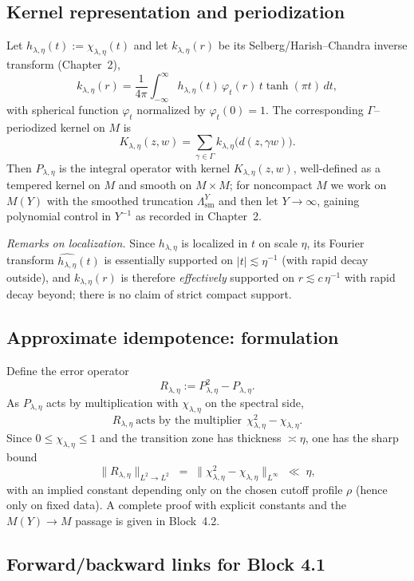 \subsection*{Kernel representation and periodization}

Let $h_{\lambda,\eta}(t):=\chi_{\lambda,\eta}(t)$ and let $k_{\lambda,\eta}(r)$ be its
Selberg/Harish–Chandra inverse transform (Chapter~2),
\[
  k_{\lambda,\eta}(r)
  = \frac{1}{4\pi}\int_{-\infty}^{\infty} h_{\lambda,\eta}(t)\,\varphi_t(r)\,t\tanh(\pi t)\,dt,
\]
with spherical function $\varphi_t$ normalized by $\varphi_t(0)=1$.
The corresponding $\Gamma$–periodized kernel on $M$ is
\[
  K_{\lambda,\eta}(z,w)=\sum_{\gamma\in\Gamma} k_{\lambda,\eta}\!\big(d(z,\gamma w)\big).
\]
Then $P_{\lambda,\eta}$ is the integral operator with kernel $K_{\lambda,\eta}(z,w)$,
well-defined as a tempered kernel on $M$ and smooth on $M\times M$; for noncompact $M$
we work on $M(Y)$ with the smoothed truncation $\Lambda^Y_{\mathrm{sm}}$ and then let $Y\to\infty$,
gaining polynomial control in $Y^{-1}$ as recorded in Chapter~2. 

\medskip
\noindent\emph{Remarks on localization.}
Since $h_{\lambda,\eta}$ is localized in $t$ on scale $\eta$, its Fourier transform
$\widehat{h_{\lambda,\eta}}(t)$ is essentially supported on $|t|\lesssim \eta^{-1}$
(with rapid decay outside), and $k_{\lambda,\eta}(r)$ is therefore \emph{effectively} supported on
$r\lesssim c\,\eta^{-1}$ with rapid decay beyond; there is no claim of strict compact support.

\subsection*{Approximate idempotence: formulation}

Define the error operator
\[
  R_{\lambda,\eta}:=P_{\lambda,\eta}^2-P_{\lambda,\eta}.
\]
As $P_{\lambda,\eta}$ acts by multiplication with $\chi_{\lambda,\eta}$ on the spectral side,
\[
  R_{\lambda,\eta}
  \ \text{acts by the multiplier}\ \
  \chi_{\lambda,\eta}^2-\chi_{\lambda,\eta}.
\]
Since $0\le \chi_{\lambda,\eta}\le 1$ and the transition zone has thickness $\asymp \eta$,
one has the sharp bound
\[
  \|R_{\lambda,\eta}\|_{L^2\to L^2}
  \;=\;\|\chi_{\lambda,\eta}^2-\chi_{\lambda,\eta}\|_{L^\infty}
  \;\ll\; \eta,
\]
with an implied constant depending only on the chosen cutoff profile $\rho$ (hence only on fixed data).
A complete proof with explicit constants and the $M(Y)\to M$ passage is given in Block~4.2.

\subsection*{Forward/backward links for Block 4.1}

